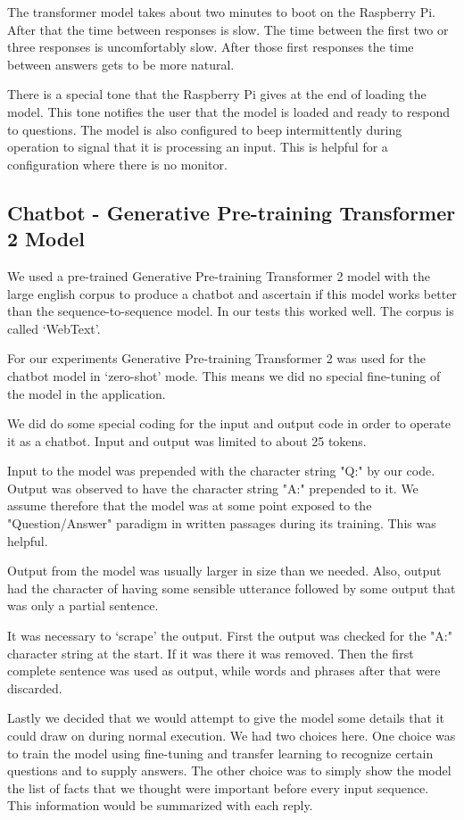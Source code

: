 The transformer model takes about two minutes to boot on the Raspberry Pi. After that the time between responses is slow. The time between the first two or three responses is uncomfortably slow. After those first responses the time between answers gets to be more natural.

There is a special tone that the Raspberry Pi gives at the end of loading the model. This tone notifies the user that the model is loaded and ready to respond to questions. The model is also configured to beep intermittently during operation to signal that it is processing an input. This is helpful for a configuration where there is no monitor.


\subsection{Chatbot - Generative Pre-training Transformer 2 Model}
We used a pre-trained Generative Pre-training Transformer 2 model with the large english corpus to produce a chatbot and ascertain if this model works better than the sequence-to-sequence model. In our tests this worked well. The corpus is called `WebText'.

For our experiments Generative Pre-training Transformer 2 was used for the chatbot model in `zero-shot' mode. This means we did no special fine-tuning of the model in the application.

We did do some special coding for the input and output code in order to operate it as a chatbot. Input and output was limited to about 25 tokens. 

Input to the model was prepended with the character string "Q:" by our code. Output was observed to have the character string "A:" prepended to it. We assume therefore that the model was at some point exposed to the "Question/Answer" paradigm in written passages during its training. This was helpful.

Output from the model was usually larger in size than we needed. Also, output had the character of having some sensible utterance followed by some output that was only a partial sentence.

It was necessary to `scrape' the output. First the output was checked for the "A:" character string at the start. If it was there it was removed. Then the first complete sentence was used as output, while words and phrases after that were discarded.

Lastly we decided that we would attempt to give the model some details that it could draw on during normal execution. We had two choices here. One choice was to train the model using fine-tuning and transfer learning to recognize certain questions and to supply answers. The other choice was to simply show the model the list of facts that we thought were important before every input sequence. This information would be summarized with each reply.

